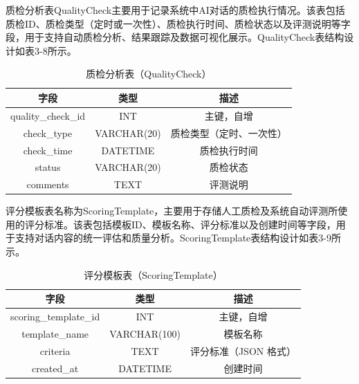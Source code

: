 质检分析表QualityCheck主要用于记录系统中AI对话的质检执行情况。该表包括质检ID、质检类型（定时或一次性）、质检执行时间、质检状态以及评测说明等字段，用于支持自动质检分析、结果跟踪及数据可视化展示。QualityCheck表结构设计如表3-8所示。
\begin{table}[h!]
\centering
\caption{质检分析表（QualityCheck）}
\begin{tabular}{|c|c|c|}
\hline
字段         & 类型         & 描述                    \\
\hline
quality\_check\_id           & INT          & 主键，自增              \\
check\_type  & VARCHAR(20)  & 质检类型（定时、一次性） \\
check\_time  & DATETIME     & 质检执行时间            \\
status       & VARCHAR(20)  & 质检状态                \\
comments     & TEXT         & 评测说明                \\
\hline
\end{tabular}
\end{table}

评分模板表名称为ScoringTemplate，主要用于存储人工质检及系统自动评测所使用的评分标准。该表包括模板ID、模板名称、评分标准以及创建时间等字段，用于支持对话内容的统一评估和质量分析。ScoringTemplate表结构设计如表3-9所示。
\begin{table}[h!]
\centering
\caption{评分模板表（ScoringTemplate）}
\begin{tabular}{|c|c|c|}
\hline
字段           & 类型         & 描述                      \\
\hline
scoring\_template\_id             & INT          & 主键，自增                \\
template\_name & VARCHAR(100) & 模板名称                  \\
criteria       & TEXT         & 评分标准（JSON 格式）     \\
created\_at    & DATETIME     & 创建时间                  \\
\hline
\end{tabular}
\end{table}

